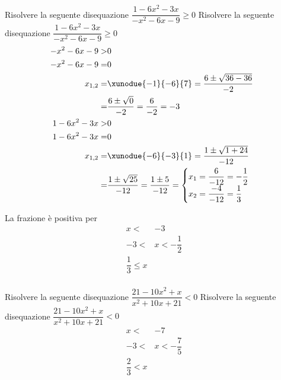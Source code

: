 \begin{exercise}
		Risolvere la seguente disequazione $\dfrac{1-6x^2-3x}{-x^2-6x-9}\geq 0$
	\tcblower
	Risolvere la seguente disequazione $\dfrac{1-6x^2-3x}{-x^2-6x-9}\geq 0$
	\begin{align*}
	-x^2-6x-9>&0\\
	-x^2-6x-9=&0\\
	x_{1,2}=&\xunodue{-1}{-6}{7}=\dfrac{6\pm\sqrt{36-36}}{-2}\\
	=&\dfrac{6\pm\sqrt{0}}{-2}=\dfrac{6}{-2}=-3\\
	1-6x^2-3x>&0\\
	1-6x^2-3x=&0\\
	x_{1,2}=&\xunodue{-6}{-3}{1}=\dfrac{1\pm\sqrt{1+24}}{-12}\\
	=&\dfrac{1\pm\sqrt{25}}{-12}=\dfrac{1\pm 5}{-12}=\begin{cases}
	x_1=\dfrac{6}{-12}=-\dfrac{1}{2}\\
	x_2=\dfrac{-4}{-12}=\dfrac{1}{3}
	\end{cases}\\
	\end{align*}
	\begin{center}
		
	\end{center}
La frazione è positiva per 
	\begin{align*}
	x<&-3\\ -3<&x<-\dfrac{1}{2}\\ \dfrac{1}{3}\leq x\\
	\end{align*}
\end{exercise}
\begin{exercise}
		Risolvere la seguente disequazione $\dfrac{21-10x^2+x}{x^2+10x+21}< 0$
	\tcblower
	Risolvere la seguente disequazione $\dfrac{21-10x^2+x}{x^2+10x+21}< 0$
	\begin{align*}
	x<&-7\\ -3<&x<-\dfrac{7}{5}\\ \dfrac{2}{3}< x\\
	\end{align*}
\end{exercise}
